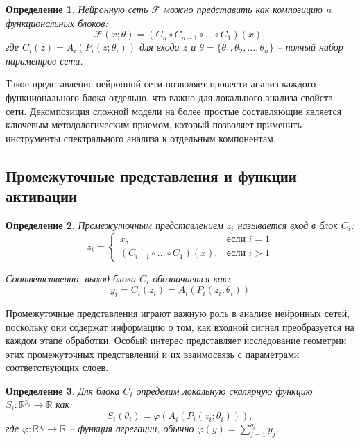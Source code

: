 \documentclass[a4paper,12pt]{article}
\newtheorem{definition}{Определение}
\begin{document}
\begin{definition}
  Нейронную сеть $\mathcal{F}$ можно представить как композицию $n$ функциональных блоков:
  \begin{equation}
    \mathcal{F}(x; \theta) = (C_n \circ C_{n-1} \circ \ldots \circ C_1)(x),
  \end{equation}
  где $C_i(z) = A_i(P_i(z; \theta_i))$ для входа $z$ и $\theta = \{\theta_1, \theta_2, \ldots, \theta_n\}$ --
  полный набор параметров сети.
\end{definition}

Такое представление нейронной сети позволяет провести анализ каждого функционального блока отдельно, что важно
для локального анализа свойств сети. Декомпозиция сложной модели на более простые составляющие является
ключевым методологическим приемом, который позволяет применить инструменты спектрального анализа к отдельным
компонентам.

\subsection{Промежуточные представления и функции активации}

\begin{definition}
  Промежуточным представлением $z_i$ называется вход в блок $C_i$:
  \begin{equation}
    z_i =
    \begin{cases}
      x, & \text{если } i = 1 \\
      (C_{i-1} \circ \ldots \circ C_1)(x), & \text{если } i > 1
    \end{cases}
  \end{equation}

  Соответственно, выход блока $C_i$ обозначается как:
  \begin{equation}
    y_i = C_i(z_i) = A_i(P_i(z_i; \theta_i))
  \end{equation}
\end{definition}

Промежуточные представления играют важную роль в анализе нейронных сетей, поскольку они содержат информацию о
том, как входной сигнал преобразуется на каждом этапе обработки. Особый интерес представляет исследование
геометрии этих промежуточных представлений и их взаимосвязь с параметрами соответствующих слоев.

\begin{definition}
  Для блока $C_i$ определим локальную скалярную функцию $S_i: \mathbb{R}^{p_i} \rightarrow \mathbb{R}$ как:
  \begin{equation}
    S_i(\theta_i) = \varphi(A_i(P_i(z_i; \theta_i))),
  \end{equation}
  где $\varphi: \mathbb{R}^{q_i} \rightarrow \mathbb{R}$ -- функция агрегации, обычно $\varphi(y) =
  \sum_{j=1}^{q_i} y_j$.
\end{definition}
\end{document}
